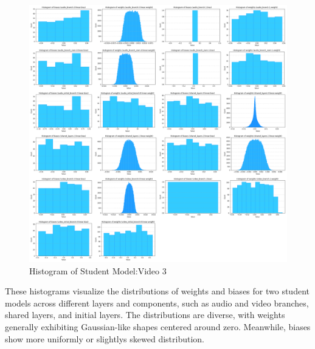     \begin{figure}[H]
        \centering
        \includegraphics[width=\linewidth]{assets/quantization/histogram/histogram_rick_student.png}
        \caption{Histogram of Student Model:Video 3}
        \label{fig:hist-student-vid3}
    \end{figure}

    These histograms visualize the distributions of weights and biases for two student models across different layers and components, such as audio and video branches, shared layers, and initial layers. The distributions are diverse, with weights generally exhibiting Gaussian-like shapes centered around zero. Meanwhile, biases show more uniformly or slightlys skewed distribution.
    \pagebreak
